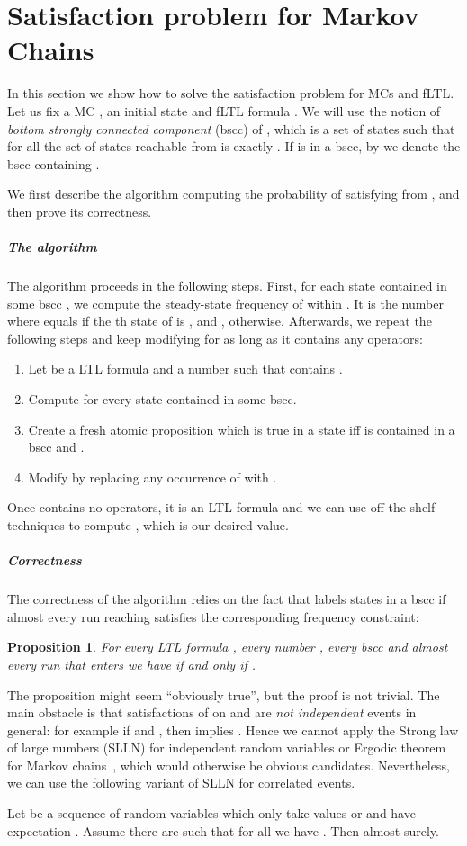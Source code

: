\documentclass[a4paper,UKenglish]{lipics}
\newtheorem{proposition}[theorem]{\bfseries  Proposition}
\begin{document}
\section{Satisfaction problem for Markov Chains}
\label{sec:mc}

In this section we show how to solve the satisfaction problem for MCs and fLTL.
Let us fix a MC , an initial state  and fLTL formula .
We will use the notion of {\em bottom strongly connected component} (bscc) of , which
is a set of
states  such that for all  the set of states reachable from 
is exactly . If  is in a bscc, by  we denote the bscc containing .

We first describe the algorithm computing the probability of satisfying  from , and
then prove its correctness.

\subparagraph{The algorithm}
The algorithm proceeds in the following steps. First, 
for each state contained in some bscc , we compute the steady-state
frequency  of  within . It is the number  where  equals  if the th state of  is , and , otherwise. Afterwards,
we repeat the following steps and keep modifying  for as long as it contains any  operators:
\begin{enumerate}
	\item Let  be a LTL formula and  a number such that  contains .
	\item Compute  for every state  contained in some bscc.
	\item Create a fresh atomic proposition  which is true in a state  iff  is contained in a bscc and
	. 
	\item Modify  by replacing any occurrence of  with .
\end{enumerate}
Once  contains no  operators, it is an LTL formula and we can use off-the-shelf techniques to compute ,
which is our desired value.

\subparagraph{Correctness}
The correctness of the algorithm relies on the fact that  labels states in a bscc  if almost every run reaching  satisfies the corresponding frequency constraint:

\begin{proposition}\label{prop:mc-replace}
	For every LTL formula , every number , every bscc  and almost every run  that enters  we have
	 if and only if .
\end{proposition}

The proposition might seem ``obviously true'', but the proof is not trivial.
The main obstacle is that satisfactions of  on  and 
are {\em not independent} events in general: for example if  and , then  implies
. Hence we cannot apply the Strong law of large numbers (SLLN) for independent random variables or
Ergodic theorem for Markov chains~\cite[Theorems 1.10.1-2]{Norris}, which would otherwise be obvious candidates.
Nevertheless, we can use the following variant of SLLN for correlated events.
\begin{lemma}\label{lemma:alt-slln}
	Let  be a sequence of random variables which only take values  or  and have expectation . Assume there are  such that for all  we have . Then
	 almost surely.
\end{lemma}
\end{document}
